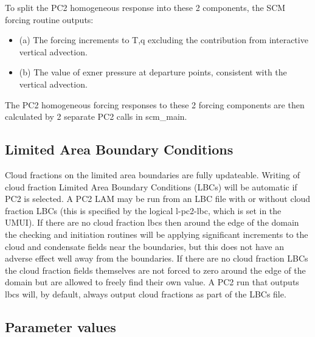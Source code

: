 \documentclass{UMDP_article}
\begin{document}
To split the PC2 homogeneous response into these 2 components, the SCM
forcing routine outputs:
\begin{itemize}
\item (a) The forcing increments to T,q excluding the contribution from
interactive vertical advection.
\item (b) The value of exner pressure at departure points, consistent with
the vertical advection.
\end{itemize}
The PC2 homogeneous forcing responses to these 2 forcing components
are then calculated by 2 separate PC2 calls in scm\_main.

\subsection{Limited Area Boundary Conditions}

Cloud fractions on the limited area boundaries are fully updateable.
Writing of cloud fraction Limited Area Boundary Conditions (LBCs)
will be automatic if PC2 is selected.
A PC2 LAM may be run from an LBC file with or without cloud fraction LBCs
(this is specified by the logical l-pc2-lbc, which is set in the UMUI).
If there are no cloud fraction lbcs then around the edge of the domain the
checking and initiation routines will be applying significant increments
to the cloud and condensate fields near the boundaries, but this does
not have an adverse effect well away from the boundaries. If there are no
cloud fraction LBCs the cloud fraction fields themselves are not forced to
zero around the edge of the domain but are allowed to freely find their
own value. A PC2 run that outputs lbcs will, by default, always
output cloud fractions as part of the LBCs file.

\subsection{Parameter values}
\end{document}
